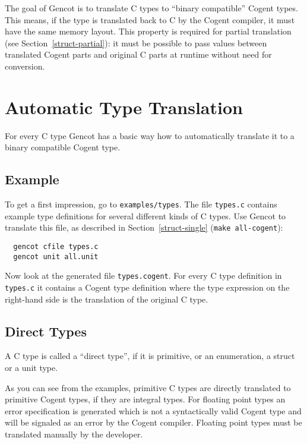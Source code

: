 \documentclass[a4paper]{report}
\newcommand{\code}[1]{\textnormal{\texttt{#1}}}
\begin{document}
The goal of Gencot is to translate C types to ``binary compatible'' Cogent types. This means, if the type is 
translated back to C by the Cogent compiler, it must have the same memory layout. This property is required
for partial translation (see Section~\ref{struct-partial}): it must be possible to pass values between 
translated Cogent parts and original C parts at runtime without need for conversion.

\section{Automatic Type Translation}
\label{types-auto}

For every C type Gencot has a basic way how to automatically translate it to a binary compatible Cogent type. 

\subsection{Example}
\label{types-auto-example}

To get a first impression, go to \code{examples/types}. The file \code{types.c} contains example type definitions
for several different kinds of C types. Use Gencot to translate this file, as described in Section~\ref{struct-single} 
(\code{make all-cogent}):
\begin{verbatim}
  gencot cfile types.c
  gencot unit all.unit
\end{verbatim}

Now look at the generated file \code{types.cogent}. For every C type definition in \code{types.c} it contains 
a Cogent type definition where the type expression on the right-hand side is the translation of the original C type.

\subsection{Direct Types}
\label{types-auto-direct}

A C type is called a ``direct type'', if it is primitive, or an enumeration, a struct or a unit type.

As you can see from the examples, primitive C types are directly translated to primitive Cogent types, if they are
integral types. For floating point types an error specification is generated which is not a syntactically valid 
Cogent type and will be signaled as an error by the Cogent compiler. Floating point types must be translated manually
by the developer.
\end{document}
